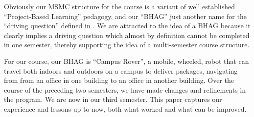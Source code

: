 Obviously our MSMC structure for the course is a variant of well established ``Project-Based Learning'' pedagogy\cite{projects}, and our ``BHAG'' just another name for the ``driving question'' defined in \cite{blumenfeld}. We are attracted to the idea of a BHAG because it clearly implies a driving question which almost by definition cannot be completed in one semester, thereby supporting the idea of a multi-semester course structure.

For our course, our BHAG is ``Campus Rover'', a mobile, wheeled, robot that can travel both indoors and outdoors on a campus to deliver packages, navigating from from an office in one building to an office in another building. Over the course of the preceding two semesters, we have made changes and refinements in the program. We are now in our third semester. This paper captures our experience and lessons up to now, both what worked and what can be improved.

